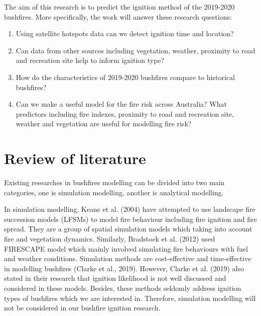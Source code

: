 \documentclass[11pt,a4paper,]{article}
\providecommand{\tightlist}{%
  \setlength{\itemsep}{0pt}\setlength{\parskip}{0pt}}
\begin{document}
The aim of this research is to predict the ignition method of the
2019-2020 bushfires. More specifically, the work will answer these
research questions:

\begin{enumerate}
\def\labelenumi{\arabic{enumi}.}
\tightlist
\item
  Using satellite hotspots data can we detect ignition time and
  location?
\item
  Can data from other sources including vegetation, weather, proximity
  to road and recreation site help to inform ignition type?
\item
  How do the characteristics of 2019-2020 bushfires compare to
  historical bushfires?
\item
  Can we make a useful model for the fire risk across Australia? What
  predictors including fire indexes, proximity to road and recreation
  site, weather and vegetation are useful for modelling fire risk?
\end{enumerate}

\section{Review of literature}\label{review-of-literature}

Existing researches in bushfires modelling can be divided into two main
categories, one is simulation modelling, another is analytical
modelling.

In simulation modelling, Keane et al. (2004) have attempted to use
landscape fire succession models (LFSMs) to model fire behaviour
including fire ignition and fire spread. They are a group of spatial
simulation models which taking into account fire and vegetation
dynamics. Similarly, Bradstock et al. (2012) used FIRESCAPE model which
mainly involved simulating fire behaviours with fuel and weather
conditions. Simulation methods are cost-effective and time-effective in
modelling bushfires (Clarke et al., 2019). However, Clarke et al. (2019)
also stated in their research that ignition likelihood is not well
discussed and considered in these models. Besides, these methods
seldomly address ignition types of bushfires which we are interested in.
Therefore, simulation modelling will not be considered in our bushfire
ignition research.
\end{document}
